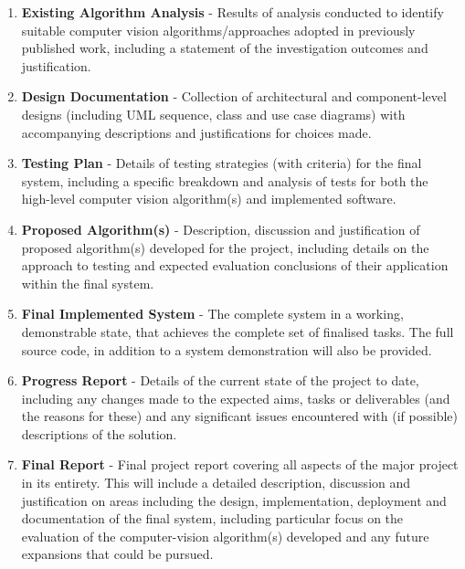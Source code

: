\documentclass[10pt,fleqn,twoside]{article}
\begin{document}
\begin{enumerate}

	\item \textbf{Existing Algorithm Analysis} - Results of analysis conducted to identify suitable computer vision algorithms/approaches adopted in previously published work, including a statement of the investigation outcomes and justification. 

	\item \textbf{Design Documentation} - Collection of architectural and component-level  designs (including UML sequence, class and use case diagrams) with accompanying descriptions and justifications for choices made.

	\item \textbf{Testing Plan} - Details of testing strategies (with criteria) for the final system, including a specific breakdown and analysis of tests for both the high-level computer vision algorithm(s) and implemented software.
	 
	\item \textbf{Proposed Algorithm(s)} -  Description, discussion and justification of proposed algorithm(s) developed for the project, including details on the approach to testing 	and expected evaluation conclusions of their application within the final system. 
	
	\item \textbf{Final Implemented System} - The complete system in a working, demonstrable state, that achieves the complete set of finalised tasks. The full source code, in addition to a system demonstration will also be provided.
	
	\item \textbf{Progress Report} - Details of the current state of the project to date, including any changes made to the expected aims, tasks or deliverables (and the reasons for these) and any significant issues encountered with (if possible) descriptions of the solution.

	\item \textbf{Final Report} - Final project report covering all aspects of the major project in its entirety. This will include a detailed description, discussion and justification on areas including the design, implementation, deployment and documentation of the final system, including particular focus on the evaluation of the computer-vision algorithm(s) developed and any future expansions that could be pursued.
		


\end{enumerate}
\end{document}
